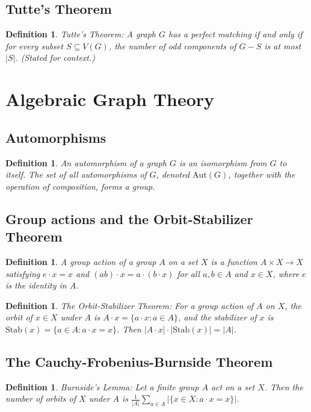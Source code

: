 \documentclass[11pt]{article}
\newtheorem{definition}[theorem]{Definition}
\begin{document}
\subsection{Tutte's Theorem}
\begin{definition}
Tutte's Theorem: A graph $G$ has a perfect matching if and only if for every subset $S\subseteq V(G)$, the number of odd components of $G-S$ is at most $|S|$. (Stated for context.)
\end{definition}
\section{Algebraic Graph Theory}
\subsection{Automorphisms}
\begin{definition}
An automorphism of a graph $G$ is an isomorphism from $G$ to itself. The set of all automorphisms of $G$, denoted $\mathrm{Aut}(G)$, together with the operation of composition, forms a group.
\end{definition}
\subsection{Group actions and the Orbit-Stabilizer Theorem}
\begin{definition}
A group action of a group $A$ on a set $X$ is a function $A\times X\to X$ satisfying $e\cdot x = x$ and $(ab)\cdot x = a\cdot(b\cdot x)$ for all $a,b\in A$ and $x\in X$, where $e$ is the identity in $A$. 
\end{definition}
\begin{definition}
The Orbit-Stabilizer Theorem: For a group action of $A$ on $X$, the orbit of $x\in X$ under $A$ is $A\cdot x = \{a\cdot x: a\in A\}$, and the stabilizer of $x$ is $\mathrm{Stab}(x)=\{a\in A: a\cdot x = x\}$. Then $|A\cdot x|\cdot |\mathrm{Stab}(x)| = |A|$.
\end{definition}
\subsection{The Cauchy-Frobenius-Burnside Theorem}
\begin{definition}
Burnside's Lemma: Let a finite group $A$ act on a set $X$. Then the number of orbits of $X$ under $A$ is 
$\frac{1}{|A|}\sum_{a\in A} |\{x\in X: a\cdot x = x\}|$.
\end{definition}
\end{document}
